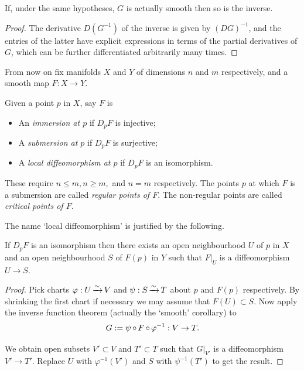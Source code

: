 \documentclass[a4paper,11pt]{article}
\begin{document}
	\begin{cor}
		If, under the same hypotheses, $G$ is actually smooth then so is the inverse.
	\end{cor}

	\begin{proof}
		The derivative $D(G^{-1})$ of the inverse is given by $(DG)^{-1}$, and the entries of the latter have explicit expressions in terms of the partial derivatives of $G$, which can be further differentiated arbitrarily many times.
	\end{proof}

	From now on fix manifolds $X$ and $Y$ of dimensions $n$ and $m$ respectively, and a smooth map $F: X\to Y$.

	\begin{defi}
		Given a point $p$ in $X$, say $F$ is
		\begin{itemize}
			\item An \emph{immersion at $p$} if $D_p F$ is injective;
			\item A \emph{submersion at $p$} if $D_p F$ is surjective;
			\item A \emph{local diffeomorphism at $p$} if $D_p F$ is an isomorphism. 
		\end{itemize}

		These require $n \leq m, n \geq m,$ and $n = m$ respectively. The points $p$ at which $F$ is a submersion are called \emph{regular points of $F$}. The non-regular points are called \emph{critical points of $F$}.
	\end{defi}

	The name `local diffeomorphism' is justified by the following.

	\begin{prop}
		If $D_p F$ is an isomorphism then there exists an open neighbourhood $U$ of $p$ in $X$ and an open neighbourhood $S$ of $F(p)$ in $Y$ such that $F\big|_{U}$ is a diffeomorphism $U \to S$.
		\label{prop:1.71}
	\end{prop}
	\begin{proof}
		Pick charts $\varphi : U \operatorname{\xrightarrow{\sim}} V$ and $\psi : S \operatorname{\xrightarrow{\sim}} T$ about $p$ and $F(p)$ respectively. By shrinking the first chart if necessary we may assume that $F(U)\subset S$. Now apply the inverse function theorem (actually the `smooth' corollary) to
		\[
			G : = \psi \operatorname{\circ} F \operatorname{\circ} \varphi^{-1} : V \to T.
		\]
		
		We obtain open subsets $V' \subset V$ and $T' \subset T$ such that $G\big|_{V'}$ is a diffeomorphism $V' \to T'$. Replace $U$ with $\varphi^{-1}(V')$ and $S$ with $\psi^{-1}(T')$ to get the result.
	\end{proof}
\end{document}
